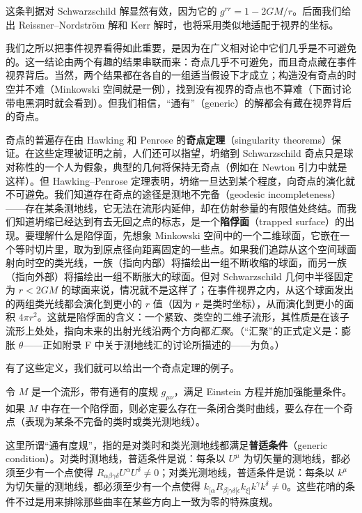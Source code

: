 这条判据对 Schwarzschild 解显然有效，因为它的 $g^{rr}=1-2GM/r$。后面我们给出 Reissner–Nordström 解和 Kerr 解时，也将采用类似地适配于视界的坐标。

我们之所以把事件视界看得如此重要，是因为在广义相对论中它们几乎是不可避免的。这一结论由两个有趣的结果串联而来：奇点几乎不可避免，而且奇点藏在事件视界背后。当然，两个结果都在各自的一组适当假设下才成立；构造没有奇点的时空并不难（Minkowski 空间就是一例），找到没有视界的奇点也不算难（下面讨论带电黑洞时就会看到）。但我们相信，“通有”（generic）的解都会有藏在视界背后的奇点。

奇点的普遍存在由 Hawking 和 Penrose 的\textbf{奇点定理}（singularity theorems）保证。在这些定理被证明之前，人们还可以指望，坍缩到 Schwarzschild 奇点只是球对称性的一个人为假象，典型的几何将保持无奇点（例如在 Newton 引力中就是这样）。但 Hawking–Penrose 定理表明，坍缩一旦达到某个程度，向奇点的演化就不可避免。我们知道存在奇点的途径是测地不完备（geodesic incompleteness）——存在某条测地线，它无法在流形内延伸，却在仿射参量的有限值处终结。而我们知道坍缩已经达到有去无回之点的标志，是一个\textbf{陷俘面}（trapped surface）的出现。要理解什么是陷俘面，先想象 Minkowski 空间中的一个二维球面，它嵌在一个等时切片里，取为到原点径向距离固定的一些点。如果我们追踪从这个空间球面射向时空的类光线，一族（指向内部）将描绘出一组不断收缩的球面，而另一族（指向外部）将描绘出一组不断胀大的球面。但对 Schwarzschild 几何中半径固定为 $r<2GM$ 的球面来说，情况就不是这样了；在事件视界之内，从这个球面发出的两组类光线都会演化到更小的 $r$ 值（因为 $r$ 是类时坐标），从而演化到更小的面积 $4\pi r^{2}$。这就是陷俘面的含义：一个紧致、类空的二维子流形，其性质是在该子流形上处处，指向未来的出射光线沿两个方向都\emph{汇聚}。（“汇聚”的正式定义是：膨胀 $\theta$——正如附录 F 中关于测地线汇的讨论所描述的——为负。）

有了这些定义，我们就可以给出一个奇点定理的例子。

令 $M$ 是一个流形，带有通有的度规 $g_{\mu\nu}$，满足 Einstein 方程并施加强能量条件。如果 $M$ 中存在一个陷俘面，则必定要么存在一条闭合类时曲线，要么存在一个奇点（表现为某条不完备的类时或类光测地线）。

这里所谓“通有度规”，指的是对类时和类光测地线都满足\textbf{普适条件}（generic condition）。对类时测地线，普适条件是说：每条以 $U^{\mu}$ 为切矢量的测地线，都必须至少有一个点使得 $R_{\alpha\beta\gamma\delta}U^{\alpha}U^{\delta}\neq 0$；对类光测地线，普适条件是说：每条以 $k^{\mu}$ 为切矢量的测地线，都必须至少有一个点使得 $k_{[\alpha}R_{\beta]\gamma\delta[\epsilon}k_{\xi]}k^{\gamma}k^{\delta}\neq 0$。这些花哨的条件不过是用来排除那些曲率在某些方向上一致为零的特殊度规。

